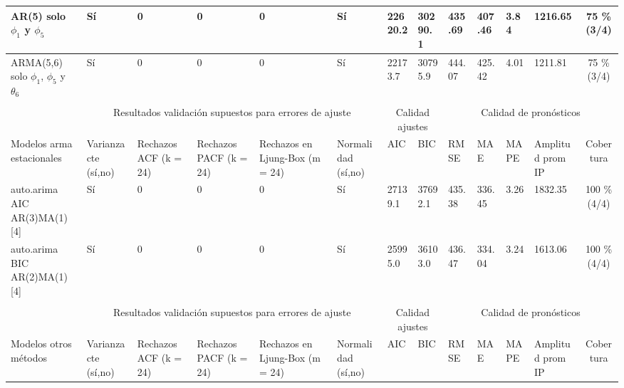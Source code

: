 \documentclass[11pt, letterpaper, twoside]{article}
\begin{document}
\begin{sidewaystable}
{\begin{tabular}{|p{1.8cm}|p{1.8cm}|p{1.8cm}|p{1.8cm}|p{1.7cm}|p{1.7cm}|p{0.9cm}|p{0.9cm}|p{0.8cm}|p{0.8cm}|p{0.9cm}|p{1.3cm}|c|}
 \hline
 AR(5) \newline solo $\phi_1$ y $\phi_5$ & Sí & 0 & 0 & 0 & Sí & 22620.2 & 30290.1 & 435.69 & 407.46 & 3.84 & 1216.65 & 75 \% (3/4) \\
 \hline
 ARMA(5,6) \newline solo $\phi_1$, $\phi_5$ y $\theta_6$  & Sí & 0 & 0 & 0 & Sí & 22173.7 & 30795.9 & 444.07 & 425.42 & 4.01 & 1211.81 & 75 \% (3/4) \\
 \hline
 \multicolumn{13}{c}{} \\
 \hline
  & \multicolumn{5}{c}{Resultados validación supuestos para errores de ajuste} & \multicolumn{2}{|c|}{Calidad ajustes} & \multicolumn{5}{c|}{Calidad de pronósticos} \\
 \hline
 Modelos \newline arma \newline estacionales & Varianza cte \newline (sí,no) & Rechazos \newline ACF \newline (k = 24) & Rechazos \newline PACF \newline (k =  24) & Rechazos en \newline Ljung-Box \newline (m = 24) & Normalidad \newline (sí,no) & AIC & BIC & RMSE & MAE & MAPE & Amplitud \newline prom IP & Cobertura \\
 \hline
 \tiny{auto.arima AIC \newline AR(3)MA(1)[4]} & Sí & 0 & 0 & 0 & Sí & 27139.1 & 37692.1 & 435.38 & 336.45 & 3.26 &  1832.35 & 100 \% (4/4) \\
 \hline
 \tiny{auto.arima BIC \newline AR(2)MA(1)[4]} & Sí & 0 & 0 & 0 & Sí & 25995.0 & 36103.0 & 436.47 & 334.04 & 3.24 & 1613.06 & 100 \% (4/4) \\
 \hline
 \multicolumn{13}{c}{} \\
 \hline
  & \multicolumn{5}{c}{Resultados validación supuestos para errores de ajuste} & \multicolumn{2}{|c|}{Calidad ajustes} & \multicolumn{5}{c|}{Calidad de pronósticos} \\
 \hline
 Modelos \newline otros \newline métodos & Varianza cte \newline (sí,no) & Rechazos \newline ACF \newline (k = 24) & Rechazos \newline PACF \newline (k =  24) & Rechazos en \newline Ljung-Box \newline (m =  24) & Normalidad \newline (sí,no) & AIC & BIC & RMSE & MAE & MAPE & Amplitud \newline prom IP & Cobertura \\

\end{tabular}}
\end{sidewaystable}
\end{document}
